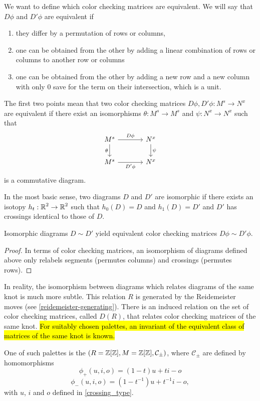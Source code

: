 We want to define which color checking matrices are equivalent. We will say that $D\phi$ and $D'\phi$ are equivalent if 
\begin{enumerate}
  \item they differ by a permutation of rows or columns, 
  \item one can be obtained from the other by adding a linear combination of rows or columns to another row or columns 
  \item one can be obtained from the other by adding a new row and a new column with only $0$ save for the term on their intersection, which is a unit.
\end{enumerate}
The first two points mean that two color checking matrices $D\phi, D'\phi:M^s\to N^x$ are equivalent if there exist an isomorphisms $\theta:M^s\to M^s$ and $\psi:N^x\to N^x$ such that
$$
\begin{tikzcd}[column sep=large]
  M^s\arrow[r, "D\phi"]\arrow[d, "\theta" left] & N^x\arrow[d, "\psi" right]\\ 
  M^s\arrow[r, "D'\phi" below] & N^x
\end{tikzcd}
$$
is a commutative diagram. 

In the most basic sense, two diagrams $D$ and $D'$ are isomorphic if there exists an isotopy $h_t:\operatorname{\mathbb{R}}^2\to \operatorname{\mathbb{R}}^2$ such that $h_0(D)=D$ and $h_1(D)=D'$ and $D'$ has crossings identical to those of $D$.

\begin{lemma}
  Isomorphic diagrams $D\sim D'$ yield equivalent color checking matrices $D\phi\sim D'\phi$.
\end{lemma}

\begin{proof}
  In terms of color checking matrices, an isomorphism of diagrams defined above only relabels segments (permutes columns) and crossings (permutes rows).
\end{proof}

In reality, the isomorphism between diagrams which relates diagrams of the same knot is much more subtle. This relation $R$ is generated by the Reidemeister moves (see \cref{reidemeister-generating}). There is an induced relation on the set of color checking matrices, called $D(R)$, that relates color checking matrices of the same knot. 
\hl{For suitably chosen palettes, an invariant of the equivalent class of matrices of the same knot is known.} 

\begin{definition}
One of such palettes is the  {\boldmath$(R=\operatorname{\mathbb{Z}}[\operatorname{\mathbb{Z}}], M=\operatorname{\mathbb{Z}}[\operatorname{\mathbb{Z}}], \mathcal{C}_\pm)$}, where $\mathcal{C}_\pm$ are defined by homomorphisms
$$\phi_+(u,i,o)=(1-t)u+ti-o$$
$$\phi_-(u,i,o)=(1-t^{-1})u+t^{-1}i-o,$$
with $u$, $i$ and $o$ defined in \cref{crossing_type}. 
\end{definition}

